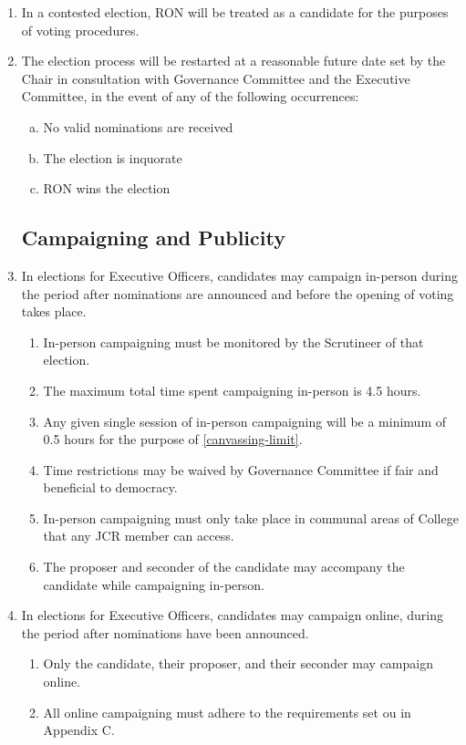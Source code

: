 \documentclass[12pt]{article}
\begin{document}
\begin{enumerate}
    \item In a contested election, RON will be treated as a candidate for the purposes of voting procedures.
    \item The election process will be restarted at a reasonable future date set by the Chair in consultation with Governance Committee and the Executive Committee, in the event of any of the following occurrences:
    \begin{enumerate}[(a)]
        \item No valid nominations are received
        \item The election is inquorate
        \item RON wins the election
    \end{enumerate}
    \subsection{Campaigning and Publicity}
    \item In elections for Executive Officers, candidates may campaign in-person during the period after nominations are announced and before the opening of voting takes place.
    \begin{enumerate}
        \item In-person campaigning must be monitored by the Scrutineer of that election.
        \item\label{canvassing-limit} The maximum total time spent campaigning in-person is 4.5 hours.
        \item Any given single session of in-person campaigning will be a minimum of 0.5 hours for the purpose of \ref{canvassing-limit}.
        \item Time restrictions may be waived by Governance Committee if fair and beneficial to democracy.
        \item In-person campaigning must only take place in communal areas of College that any JCR member can access.
        \item The proposer and seconder of the candidate may accompany the candidate while campaigning in-person.
    \end{enumerate}
    \item In elections for Executive Officers, candidates may campaign online, during the period after nominations have been announced.
    \begin{enumerate}
        \item Only the candidate, their proposer, and their seconder may campaign online.
        \item All online campaigning must adhere to the requirements set ou in Appendix C.

\end{enumerate}
\end{enumerate}
\end{document}
